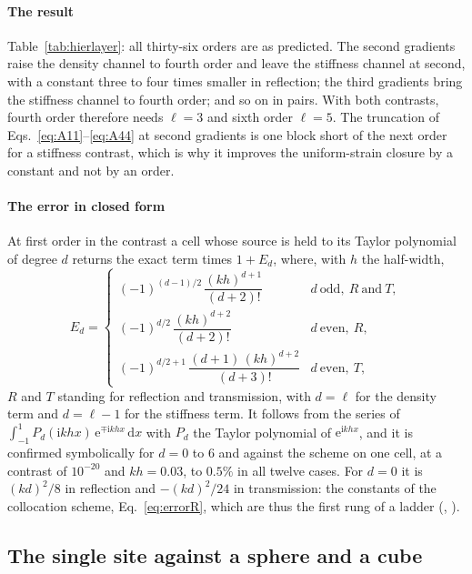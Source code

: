 \documentclass[preprint,review,12pt]{elsarticle}
\newcommand{\dd}{\mathrm{d}}
\begin{document}
\paragraph{The result} Table~\ref{tab:hierlayer}: all thirty-six orders are as predicted. The second
gradients raise the density channel to fourth order and leave the stiffness channel at second, with a
constant three to four times smaller in reflection; the third gradients bring the stiffness channel to fourth
order; and so on in pairs. With both contrasts, fourth order therefore needs $\ell=3$ and sixth order
$\ell=5$. The truncation of Eqs.~\eqref{eq:A11}--\eqref{eq:A44} at second gradients is one block short
of the next order for a stiffness contrast, which is why it improves the uniform-strain closure by a
constant and not by an order.

\paragraph{The error in closed form} At first order in the contrast a cell whose source is held to
its Taylor polynomial of degree $d$ returns the exact term times $1+E_d$, where, with $h$ the
half-width,
\begin{equation}\label{eq:taylorfactor}
  E_d=\begin{cases}
  (-1)^{(d-1)/2}\,\dfrac{(kh)^{d+1}}{(d+2)!} & d\ \text{odd},\ R\ \text{and}\ T,\\[10pt]
  (-1)^{d/2}\,\dfrac{(kh)^{d+2}}{(d+2)!} & d\ \text{even},\ R,\\[10pt]
  (-1)^{d/2+1}\,\dfrac{(d+1)\,(kh)^{d+2}}{(d+3)!} & d\ \text{even},\ T,
  \end{cases}
\end{equation}
$R$ and $T$ standing for reflection and transmission,
with $d=\ell$ for the density term and $d=\ell-1$ for the stiffness term. It follows from the series of
$\int_{-1}^{1}P_d(\mathrm{i}khx)\,\mathrm{e}^{\mp\mathrm{i}khx}\,\dd x$ with $P_d$ the Taylor polynomial
of $\mathrm{e}^{\mathrm{i}khx}$, and it is confirmed symbolically for $d=0$ to $6$ and against the
scheme on one cell, at a contrast of $10^{-20}$ and $kh=0.03$, to $0.5\%$ in all twelve cases. For
$d=0$ it is $(kd)^2/8$ in reflection and $-(kd)^2/24$ in transmission: the constants of the collocation
scheme, Eq.~\eqref{eq:errorR}, which are thus the first rung of a ladder
(, ).

\subsection{The single site against a sphere and a cube}\label{sec:singlesite}
\end{document}
